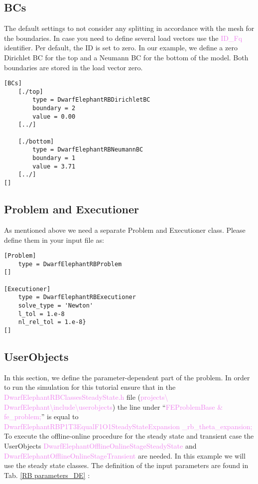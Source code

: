 \documentclass[11pt, a4paper, DIV=14]{scrartcl}
\begin{document}
\subsection{BCs}
The default settings to not consider any splitting in accordance with the mesh for the boundaries. In case you need to define several load vectors use the \textcolor{violet}{ID\_Fq} identifier. Per default, the ID is set to zero.
In our example, we define a zero Dirichlet BC for the top and a Neumann BC for the bottom of the model. Both boundaries are stored in the load vector zero.
\begin{lstlisting}
[BCs]
    [./top]
        type = DwarfElephantRBDirichletBC
        boundary = 2
        value = 0.00
    [../]

    [./bottom]
        type = DwarfElephantRBNeumannBC
        boundary = 1
        value = 3.71
    [../]
[]
\end{lstlisting}

\subsection{Problem and Executioner}
As mentioned above we need a separate Problem and Executioner class. Please define them in your input file as:
\begin{lstlisting}
[Problem]
    type = DwarfElephantRBProblem
[]

[Executioner]
    type = DwarfElephantRBExecutioner
    solve_type = 'Newton'
    l_tol = 1.e-8
    nl_rel_tol = 1.e-8}
[]
\end{lstlisting}

\subsection{UserObjects}\label{Practical:UserObjects_DE}
In this section, we define the parameter-dependent part of the problem. In order to run the simulation for this tutorial ensure that in the \textcolor{violet}{DwarfElephantRBClassesSteadyState.h} file (\textcolor{violet}{projects\textbackslash\- DwarfElephant\textbackslash\-include\textbackslash userobjects}) the line under ``\textcolor{violet}{FEProblemBase \& fe\_problem;}'' is equal to \textcolor{violet}{DwarfElephantRBP1T3EqualF1O1SteadyStateExpansion \_rb\_theta\_expansion;}
To execute the offline-online procedure for the steady state and transient case the UserObjects \textcolor{violet}{DwarfElephantOfflineOnlineStageSteadyState} and \textcolor{violet}{DwarfElephantOfflineOnlineStageTransient} are needed.
In this example we will use the steady state classes. The definition of the input parameters are found in Tab. \ref{RB parameters_DE} :
\end{document}
